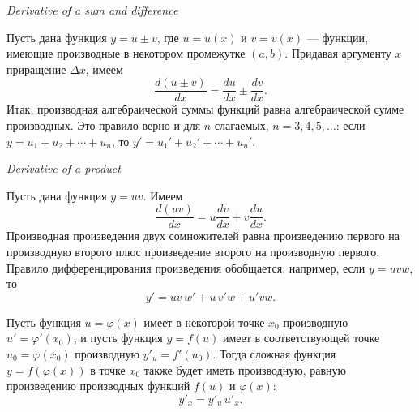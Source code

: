 {\noindent\bfseries{}\par}
{\noindent\itshape Derivative of a sum and difference\par}
\begin{rusblock}
Пусть дана функция $y=u\pm v$, где $u=u(x)$ и $v=v(x)$ --- функции, имеющие производные в некотором промежутке $(a,b)$. Придавая аргументу $x$ приращение $\Delta x$, имеем
\[
\frac{d(u\pm v)}{dx}=\frac{du}{dx}\pm\frac{dv}{dx}.
\]
Итак, производная алгебраической суммы функций равна алгебраической сумме производных. Это правило верно и для $n$ слагаемых, $n=3,4,5,\ldots$: если $y=u_1+u_2+\cdots+u_n$, то $y' = u_1' + u_2' + \cdots + u_n'$.
\end{rusblock}

{\noindent\bfseries{}\par}
{\noindent\itshape Derivative of a product\par}
\begin{rusblock}
Пусть дана функция $y=uv$. Имеем
\[
\frac{d(uv)}{dx}=u\frac{dv}{dx}+v\frac{du}{dx}.
\]
Производная произведения двух сомножителей равна произведению первого на производную второго плюс произведение второго на производную первого. Правило дифференцирования произведения обобщается; например, если $y=uvw$, то
\[
y'=uv\,w'+u\,v'w+u'vw.
\]
\end{rusblock}

\begin{rusblock}
Пусть функция $u=\varphi(x)$ имеет в некоторой точке $x_0$ производную $u'=\varphi'(x_0)$, и пусть функция $y=f(u)$ имеет в соответствующей точке $u_0=\varphi(x_0)$ производную $y'_u=f'(u_0)$. Тогда сложная функция $y=f(\varphi(x))$ в точке $x_0$ также будет иметь производную, равную произведению производных функций $f(u)$ и $\varphi(x)$:
\[
y'_x=y'_u\,u'_x.
\]
\end{rusblock}

